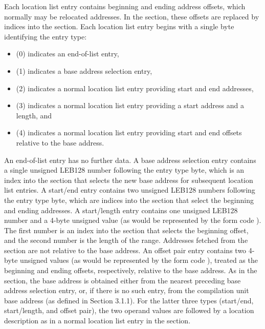 Each location list entry contains beginning and ending address
offsets, which normally may be relocated addresses. In the
\dotdebuglocdwo{} section, these offsets are replaced by indices
into the \dotdebugaddr{} section. Each location list entry begins
with a single byte identifying the entry type:
\begin{itemize}
\item
\DWLLEendoflistentry{} (0) indicates an end-of-list entry,
\item
\DWLLEbaseaddressselectionentry{} (1) indicates a base address
selection entry, 
\item
\DWLLEstartendentry{} (2) indicates a normal
location list entry providing start and end addresses,
\item
\DWLLEstartlengthentry{} (3) indicates a normal location list
entry providing a start address and a length, and
\item
\DWLLEoffsetpairentry{} (4) indicates a normal location list
entry providing start and end offsets relative to the base
address. 
\end{itemize}
An end-of-list entry has no further data. A base address
selection entry contains a single unsigned LEB128 number
following the entry type byte, which is an index into the
\dotdebugaddr{} section that selects the new base address for
subsequent location list entries. A start/end entry contains two
unsigned LEB128 numbers following the entry type byte, which are
indices into the \dotdebugaddr{} section that select the beginning
and ending addresses. A start/length entry contains one unsigned
LEB128 number and a 4-byte unsigned value (as would be
represented by the form code \DWFORMdatafour). The first number
is an index into the \dotdebugaddr{} section that selects the
beginning offset, and the second number is the length of the
range. Addresses fetched from the \dotdebugaddr{} section are not
relative to the base address. An offset pair entry contains two
4-byte unsigned values (as would be represented by the form code
\DWFORMdatafour){}, treated as the beginning and ending offsets,
respectively, relative to the base address. As in the \dotdebugloc{}
section, the base address is obtained either from the nearest
preceding base address selection entry, or, if there is no such
entry, from the compilation unit base address (as defined in
Section 3.1.1). For the latter three types (start/end,
start/length, and offset pair), the two operand values are
followed by a location description as in a normal location list
entry in the \dotdebugloc{} section.


